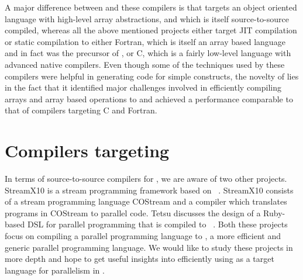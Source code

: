 A major difference between \mixten and these compilers is that \mixten targets
an object oriented language with high-level array abstractions, and which is 
itself source-to-source compiled, whereas all the above mentioned projects either target
 JIT compilation or static compilation to either Fortran, which is itself an array
based language and in fact was the precursor of \matlab, or C, which is a fairly
low-level language with advanced native compilers. 
Even though some of the techniques used by
these compilers were helpful in generating \xten code for simple \matlab constructs,
the novelty of \mixten lies in the fact that it identified major challenges
involved in efficiently compiling \matlab arrays and array based operations to 
\xten and achieved a performance comparable to that of compilers targeting 
C and Fortran.      

\section{Compilers targeting \xten} In terms of source-to-source compilers for
\xten, we are aware of two other projects.  StreamX10 is a stream programming
framework based on \xten~\cite{Wei-2012}.  StreamX10  consists of a stream
programming language COStream and a compiler which translates programs in
COStream to parallel \xten code.  Tetsu discusses the design of a Ruby-based DSL
for parallel programming that is compiled to \xten~\cite{Tetsu-2011}. Both these
projects focus on compiling a parallel programming language to \xten, a more
efficient and generic parallel programming language. We would like to study
these projects in more depth and hope to get useful insights into efficiently
using \xten as a target language for parallelism in \matlab.
 
